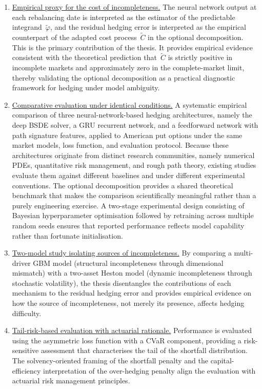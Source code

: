 \begin{enumerate}
\item \underline{Empirical proxy for the cost of incompleteness.}
  The neural network output at each rebalancing date is interpreted as
  the estimator of the predictable integrand~$\tilde{\varphi}$, and the
  residual hedging error is interpreted as the empirical counterpart of
  the adapted cost process~$\tilde{C}$ in the optional decomposition.
  This is the primary contribution of the thesis.  It provides empirical
  evidence consistent with the theoretical prediction that~$\tilde{C}$ is
  strictly positive in incomplete markets and approximately zero in the
  complete-market limit, thereby validating the optional decomposition as
  a practical diagnostic framework for hedging under model ambiguity.

\item \underline{Comparative evaluation under identical conditions.}
  A systematic empirical comparison of three neural-network-based hedging
  architectures, namely the deep BSDE solver, a GRU recurrent network, and a feedforward network with path signature features, applied to American
  put options under the same market models, loss function, and evaluation
  protocol. Because these architectures originate from distinct research
  communities, namely numerical PDEs, quantitative risk management, and rough path theory, existing studies evaluate them against different baselines and under different experimental conventions. The optional decomposition provides a shared theoretical benchmark that makes the comparison scientifically meaningful rather than a purely engineering exercise. A two-stage experimental design consisting of Bayesian hyperparameter optimisation \citep{Snoek2012} followed by retraining across multiple random seeds \citep{Henderson2018, Bouthillier2021} ensures that reported performance reflects model capability rather than fortunate initialisation.

\item \underline{Two-model study isolating sources of incompleteness.}
  By comparing a multi-driver GBM model (structural incompleteness
  through dimensional mismatch) with a two-asset Heston model (dynamic
  incompleteness through stochastic volatility), the thesis disentangles
  the contributions of each mechanism to the residual hedging error and
  provides empirical evidence on how the source of incompleteness, not
  merely its presence, affects hedging difficulty.

\item \underline{Tail-risk-based evaluation with actuarial rationale.}
  Performance is evaluated using the asymmetric loss function with a CVaR
  component, providing a risk-sensitive assessment that characterises the
  tail of the shortfall distribution.  The solvency-oriented framing of
  the shortfall penalty and the capital-efficiency interpretation of the
  over-hedging penalty align the evaluation with actuarial risk management
  principles.


\end{enumerate}
